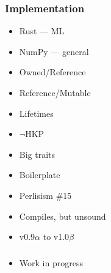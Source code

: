 \documentclass[xetex,mathserif,serif]{beamer}
\begin{document}
\begin{frame}
  \frametitle{Implementation}
  \pause
  \begin{multicols}{2}
  \begin{itemize}[<+->]
    \item Rust --- ML
    \item NumPy --- general
    \item Owned/Reference
    \item Reference/Mutable
    \item Lifetimes
    \item $\neg$HKP
    \columnbreak

    \item Big traits
    \item Boilerplate
    \item Perlisism \#15
    \item Compiles, but unsound
    \item v0.9$\alpha$ to v1.0$\beta$
  \end{itemize}
  \end{multicols}
\end{frame}

\begin{frame}
  \frametitle{}
  \begin{itemize}
    \item Work in progress
  \end{itemize}
\end{frame}
\end{document}
